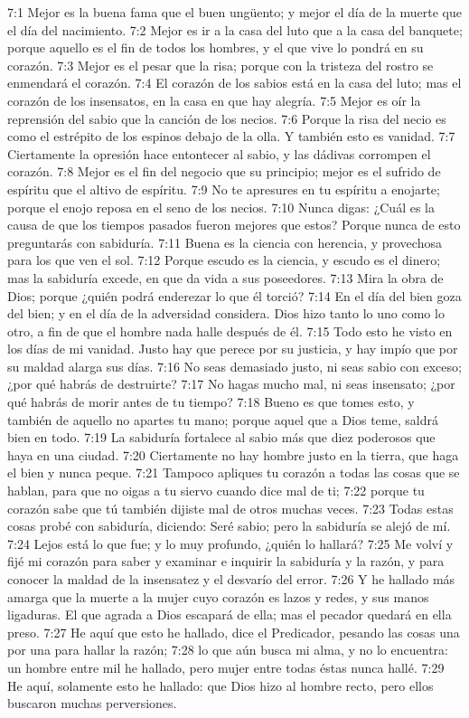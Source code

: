7:1 Mejor es la buena fama que el buen ungüento; y mejor el día de la muerte que el día del nacimiento.  
7:2 Mejor es ir a la casa del luto que a la casa del banquete; porque aquello es el fin de todos los hombres, y el que vive lo pondrá en su corazón.  
7:3 Mejor es el pesar que la risa; porque con la tristeza del rostro se enmendará el corazón.  
7:4 El corazón de los sabios está en la casa del luto; mas el corazón de los insensatos, en la casa en que hay alegría.  
7:5 Mejor es oír la reprensión del sabio que la canción de los necios.  
7:6 Porque la risa del necio es como el estrépito de los espinos debajo de la olla. Y también esto es vanidad.  
7:7 Ciertamente la opresión hace entontecer al sabio, y las dádivas corrompen el corazón.  
7:8 Mejor es el fin del negocio que su principio; mejor es el sufrido de espíritu que el altivo de espíritu.  
7:9 No te apresures en tu espíritu a enojarte; porque el enojo reposa en el seno de los necios.  
7:10 Nunca digas: ¿Cuál es la causa de que los tiempos pasados fueron mejores que estos? Porque nunca de esto preguntarás con sabiduría.  
7:11 Buena es la ciencia con herencia, y provechosa para los que ven el sol.  
7:12 Porque escudo es la ciencia, y escudo es el dinero; mas la sabiduría excede, en que da vida a sus poseedores.  
7:13 Mira la obra de Dios; porque ¿quién podrá enderezar lo que él torció?  
7:14 En el día del bien goza del bien; y en el día de la adversidad considera. Dios hizo tanto lo uno como lo otro, a fin de que el hombre nada halle después de él.  
7:15 Todo esto he visto en los días de mi vanidad. Justo hay que perece por su justicia, y hay impío que por su maldad alarga sus días.  
7:16 No seas demasiado justo, ni seas sabio con exceso; ¿por qué habrás de destruirte?  
7:17 No hagas mucho mal, ni seas insensato; ¿por qué habrás de morir antes de tu tiempo?  
7:18 Bueno es que tomes esto, y también de aquello no apartes tu mano; porque aquel que a Dios teme, saldrá bien en todo.  
7:19 La sabiduría fortalece al sabio más que diez poderosos que haya en una ciudad.  
7:20 Ciertamente no hay hombre justo en la tierra, que haga el bien y nunca peque. 
7:21 Tampoco apliques tu corazón a todas las cosas que se hablan, para que no oigas a tu siervo cuando dice mal de ti;  
7:22 porque tu corazón sabe que tú también dijiste mal de otros muchas veces.  
7:23 Todas estas cosas probé con sabiduría, diciendo: Seré sabio; pero la sabiduría se alejó de mí.  
7:24 Lejos está lo que fue; y lo muy profundo, ¿quién lo hallará?  
7:25 Me volví y fijé mi corazón para saber y examinar e inquirir la sabiduría y la razón, y para conocer la maldad de la insensatez y el desvarío del error.  
7:26 Y he hallado más amarga que la muerte a la mujer cuyo corazón es lazos y redes, y sus manos ligaduras. El que agrada a Dios escapará de ella; mas el pecador quedará en ella preso.  
7:27 He aquí que esto he hallado, dice el Predicador, pesando las cosas una por una para hallar la razón;  
7:28 lo que aún busca mi alma, y no lo encuentra: un hombre entre mil he hallado, pero mujer entre todas éstas nunca hallé.  
7:29 He aquí, solamente esto he hallado: que Dios hizo al hombre recto, pero ellos buscaron muchas perversiones.  

